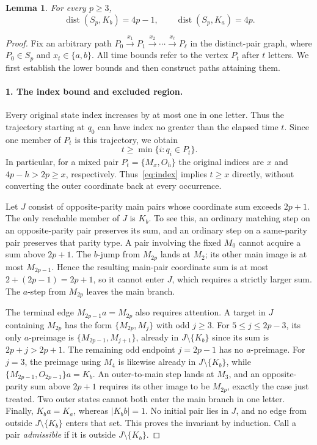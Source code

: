 \documentclass[11pt]{article}
\newtheorem{lemma}[theorem]{Lemma}
\newcommand{\dist}{\operatorname{dist}}
\newcommand{\M}[1]{M_{#1}}
\newcommand{\Ost}[1]{O_{#1}}
\newcommand{\pair}[2]{\{#1,#2\}}
\begin{document}
\begin{lemma}\label{lem:dist}
For every $p\geq3$,
\[
 \dist(S_p,K_b)=4p-1,\qquad \dist(S_p,K_a)=4p.
\]
\end{lemma}
\begin{proof}
Fix an arbitrary path $P_0\xrightarrow{x_1}P_1\xrightarrow{x_2}\cdots\xrightarrow{x_\ell}P_\ell$ in the distinct-pair graph, where $P_0\in S_p$ and $x_t\in\{a,b\}$. All time bounds refer to the vertex $P_t$ after $t$ letters. We first establish the lower bounds and then construct paths attaining them.

\paragraph{1. The index bound and excluded region.}
Every original state index increases by at most one in one letter. Thus the trajectory starting at $q_0$ can have index no greater than the elapsed time $t$. Since one member of $P_t$ is this trajectory, we obtain
\begin{equation}\label{eq:index}
 t\geq\min\{i:q_i\in P_t\}.
\end{equation}
In particular, for a mixed pair $P_t=\pair{\M x}{\Ost h}$ the original indices are $x$ and $4p-h>2p\geq x$, respectively. Thus~\eqref{eq:index} implies $t\geq x$ directly, without converting the outer coordinate back at every occurrence.

Let $J$ consist of opposite-parity main pairs whose coordinate sum exceeds $2p+1$. The only reachable member of $J$ is $K_b$.
To see this, an ordinary matching step on an opposite-parity pair preserves its sum, and an ordinary step on a same-parity pair preserves that parity type. A pair involving the fixed $\M0$ cannot acquire a sum above $2p+1$. The $b$-jump from $\M{2p}$ lands at $\M2$; its other main image is at most $\M{2p-1}$. Hence the resulting main-pair coordinate sum is at most $2+(2p-1)=2p+1$, so it cannot enter $J$, which requires a strictly larger sum. The $a$-step from $\M{2p}$ leaves the main branch.

The terminal edge $\M{2p-1}a=\M{2p}$ also requires attention. A target in $J$ containing $\M{2p}$ has the form $\pair{\M{2p}}{\M j}$ with odd $j\geq3$. For $5\leq j\leq2p-3$, its only $a$-preimage is $\pair{\M{2p-1}}{\M{j+1}}$, already in $J\setminus\{K_b\}$ since its sum is $2p+j>2p+1$. The remaining odd endpoint $j=2p-1$ has no $a$-preimage. For $j=3$, the preimage using $\M4$ is likewise already in $J\setminus\{K_b\}$, while $\pair{\M{2p-1}}{\Ost{2p-1}}a=K_b$. An outer-to-main step lands at $\M3$, and an opposite-parity sum above $2p+1$ requires its other image to be $\M{2p}$, exactly the case just treated. Two outer states cannot both enter the main branch in one letter. Finally, $K_ba=K_a$, whereas $|K_bb|=1$. No initial pair lies in $J$, and no edge from outside $J\setminus\{K_b\}$ enters that set. This proves the invariant by induction. Call a pair \emph{admissible} if it is outside $J\setminus\{K_b\}$.


\end{proof}
\end{document}
